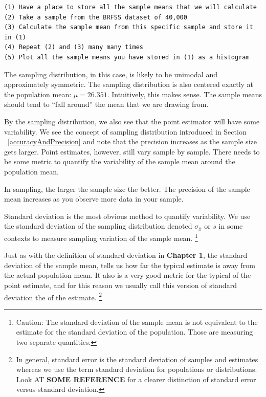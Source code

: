 \begin{verbatim}
(1) Have a place to store all the sample means that we will calculate
(2) Take a sample from the BRFSS dataset of 40,000
(3) Calculate the sample mean from this specific sample and store it in (1)
(4) Repeat (2) and (3) many many times 
(5) Plot all the sample means you have stored in (1) as a histogram
\end{verbatim}
  
The sampling distribution, in this case, is likely to be unimodal and approximately symmetric. The sampling distribution is also centered exactly at the  population mean: $\mu=26.351$. Intuitively, this makes sense. The sample means should tend to ``fall around'' the mean that we are drawing from.

By the sampling distribution, we also see that the point estimator will have some variability. We see the concept of sampling distribution introduced in Section ~\ref{accuracyAndPrecision} and note that the precision increases as the sample size gets larger. Point estimates, however, still vary sample by sample. There needs to be some metric to quantify the variability of the sample mean around the population mean.

\begin{tipBox}{
In sampling, the larger the sample size the better. The precision of the sample mean increases as you observe more data in your sample.}
\end{tipBox}

Standard deviation is the most obvious method to quantify variability. We use the standard deviation of the sampling distribution denoted  $\sigma_{\bar{x}}$ or $s$ in some contexts to measure sampling variation of the sample mean. \footnote{Caution: The standard deviation of the sample mean is not equivalent to the estimate for the standard deviation of the population. Those are measuring two separate quantities.}

Just as with the definition of standard deviation in \textbf{Chapter 1}, the standard deviation of the sample mean, tells us how far the typical estimate is away from the actual population mean. It also is a very good metric for the typical  of the point estimate, and for this reason we usually call this version of standard deviation the   of the estimate. \footnote{In general, standard error is the standard deviation of samples and estimates whereas we use the term standard deviation for populations or distributions. Look AT \textbf{SOME REFERENCE} for a clearer distinction of standard error versus standard deviation.} 

